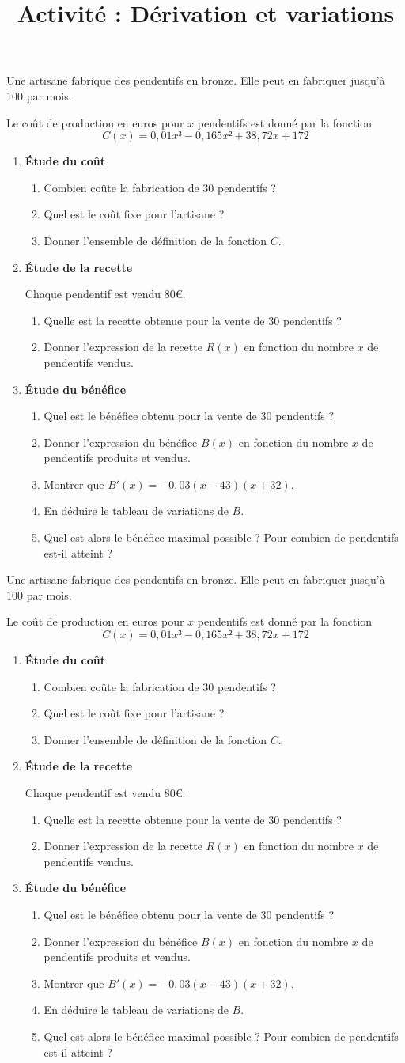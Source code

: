 \documentclass[
	classe=$1^{ere}STI2D$,
	landscape,
	twocolumn
]{exercice}
\title{Activité : Dérivation et variations}
\begin{document}
\newcommand{\Activité}{
\maketitle

\begin{tcolorbox}
	Une artisane fabrique des pendentifs en bronze. Elle peut en fabriquer jusqu'à $100$ par mois.

	Le coût de production en euros pour $x$ pendentifs est donné par la fonction
	$$ C(x) = 0,01x³ - 0,165x² + 38,72x + 172 $$
\end{tcolorbox}

\begin{enumerate}
	\item \textbf{Étude du coût}

	      \begin{enumerate}
		      \item Combien coûte la fabrication de $30$ pendentifs ?
		      \item Quel est le coût fixe pour l'artisane ?
		      \item Donner l'ensemble de définition de la fonction $C$.
	      \end{enumerate}
	\item \textbf{Étude de la recette}

	      Chaque pendentif est vendu $80$€.
	      \begin{enumerate}
		      \item Quelle est la recette obtenue pour la vente de $30$ pendentifs ?
		      \item Donner l'expression de la recette $R(x)$ en fonction du nombre $x$ de pendentifs vendus.
	      \end{enumerate}
	\item \textbf{Étude du bénéfice}

	      \begin{enumerate}
		      \item Quel est le bénéfice obtenu pour la vente de $30$ pendentifs ?
		      \item Donner l'expression du bénéfice $B(x)$ en fonction du nombre $x$ de pendentifs produits et vendus.
		      \item Montrer que $B'(x) = -0,03(x - 43)(x + 32)$.
		      \item En déduire le tableau de variations de $B$.
		      \item Quel est alors le bénéfice maximal possible ? Pour combien de pendentifs est-il atteint ?
	      \end{enumerate}
\end{enumerate}
}

\Activité

\newpage

\Activité
\end{document}
